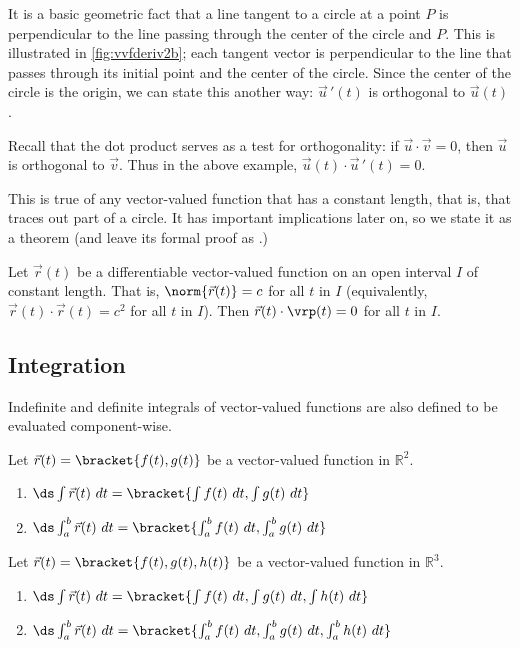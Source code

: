 It is a basic geometric fact that a line tangent to a circle at a point $P$ is perpendicular to the line passing through the center of the circle and $P$. This is illustrated in \autoref{fig:vvfderiv2b}; each tangent vector is perpendicular to the line that passes through its initial point and the center of the circle. Since the center of the circle is the origin, we can state this another way: $\vec u\,'(t)$ is orthogonal to $\vec u(t)$.

Recall that the dot product serves as a test for orthogonality: if $\vec u\cdot \vec v = 0$, then $\vec u$ is orthogonal to $\vec v$. Thus in the above example, $\vec u(t)\cdot \vec u\,'(t)=0$.

This is true of any vector-valued function that has a constant length, that is, that traces out part of a circle. It has important implications later on, so we state it as a theorem (and leave its formal proof as .)

{Let $\vec r(t)$ be a differentiable vector-valued function on an open interval $I$ of constant length. That is, $\norm{\vec r(t)} = c$ for all $t$ in $I$ (equivalently, $\vec r(t)\cdot \vec r(t) = c^2$ for all $t$ in $I$). 
Then $\vec r(t)\cdot\vrp(t) = 0$ for all $t$ in $I$.}

\subsection{Integration}

Indefinite and definite integrals of vector-valued functions are also defined to be evaluated component-wise.

{Let $\vec r(t) =\bracket{f(t),g(t)}$ be a vector-valued function in $\mathbb{R}^2$.
\begin{enumerate}
	\item $\ds \int \vec r(t)\ dt =\bracket{\int f(t)\ dt, \int g(t)\ dt}$
	\item	$\ds \int_a^b \vec r(t)\ dt =\bracket{\int_a^b f(t)\ dt, \int_a^b g(t)\ dt}$
\end{enumerate}
Let $\vec r(t) =\bracket{f(t),g(t),h(t)}$ be a vector-valued function in $\mathbb{R}^3$.
\begin{enumerate}
	\item $\ds \int \vec r(t)\ dt =\bracket{\int f(t)\ dt, \int g(t)\ dt, \int h(t)\ dt}$
	\item	$\ds \int_a^b \vec r(t)\ dt =\bracket{\int_a^b f(t)\ dt, \int_a^b g(t)\ dt, \int_a^b h(t)\ dt}$
\end{enumerate}}

